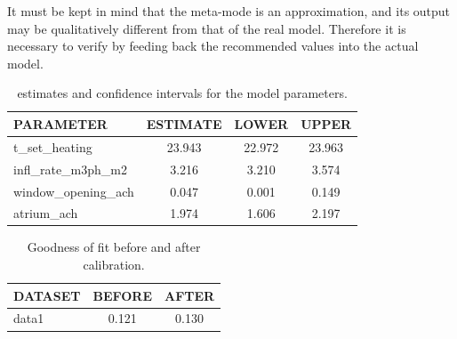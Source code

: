 \documentclass[a4paper]{report}\usepackage[]{graphicx}\usepackage[]{xcolor}
\begin{document}
It must be kept in mind that the meta-mode is an approximation, and its output may be 
	qualitatively different from that of the real model. Therefore it is necessary to verify by feeding back 
	the recommended values into the actual model.
\begin{table}[ht]
\centering
\caption{estimates and confidence intervals for the model parameters.} 
\label{tab:theta}
\begin{tabularx}{\textwidth}{X|ccc}
  \hline
PARAMETER & ESTIMATE & LOWER & UPPER \\ 
  \hline
t\_set\_heating & 23.943 & 22.972 & 23.963 \\ 
  infl\_rate\_m3ph\_m2 & 3.216 & 3.210 & 3.574 \\ 
  window\_opening\_ach & 0.047 & 0.001 & 0.149 \\ 
  atrium\_ach & 1.974 & 1.606 & 2.197 \\ 
   \hline
\end{tabularx}
\end{table}
\begin{table}[ht]
\centering
\caption{Goodness of fit before and after calibration.} 
\label{tab:gof}
\begin{tabularx}{\textwidth}{X|cc}
  \hline
DATASET & BEFORE & AFTER \\ 
  \hline
data1 & 0.121 & 0.130 \\ 
   \hline
\end{tabularx}
\end{table}
\end{document}
